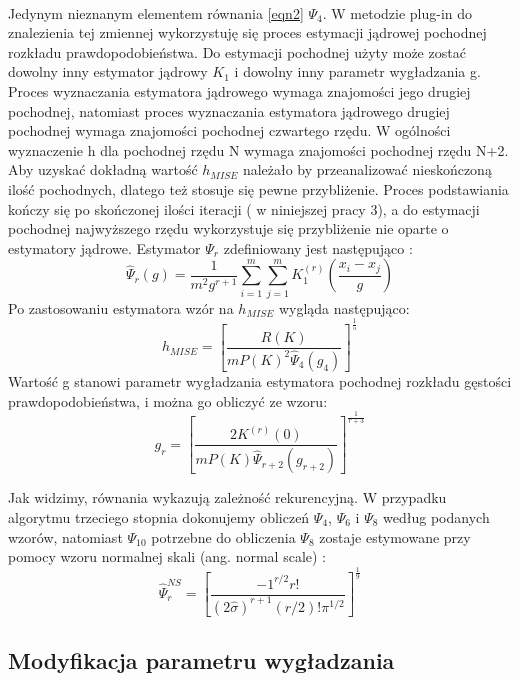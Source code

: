 \documentclass[a4paper,12pt,twoside]{article}
\begin{document}
\paragraph{}
Jedynym nieznanym elementem równania \ref{eqn2}  $\Psi_{4}$. W metodzie plug-in do znalezienia tej zmiennej wykorzystuję się proces estymacji jądrowej pochodnej rozkładu prawdopodobieństwa. Do estymacji pochodnej użyty może zostać dowolny inny estymator jądrowy $K_{1}$ i dowolny inny parametr wygładzania g. Proces wyznaczania estymatora jądrowego wymaga znajomości jego drugiej pochodnej, natomiast proces wyznaczania estymatora jądrowego drugiej pochodnej wymaga znajomości pochodnej czwartego rzędu. W ogólności wyznaczenie h dla pochodnej rzędu N wymaga znajomości pochodnej rzędu N+2. Aby uzyskać dokładną wartość $h_{MISE}$ należało by przeanalizować nieskończoną ilość pochodnych, dlatego też stosuje się pewne przybliżenie. Proces podstawiania kończy się po skończonej ilości iteracji ( w niniejszej pracy 3), a do estymacji pochodnej najwyższego rzędu wykorzystuje się przybliżenie nie oparte o estymatory jądrowe. 
Estymator $\Psi_{r}$ zdefiniowany jest następująco \cite{kde}:
\begin{equation} \hat{\Psi}_{r}(g)=\frac{1}{m^2g^{r+1}}\sum^m_{i=1}\sum^m_{j=1}K_{1}^{(r)}(\frac{x_{i}-x_{j}}{g})
\end{equation}
Po zastosowaniu estymatora wzór na $h_{MISE}$  wygląda następująco:
\begin{equation}  h_{MISE}=\left[ \frac{R(K)}{mP(K)^2 \hat{\Psi}_{4}(g_{4})}\right]^\frac{1}{5} 
\end{equation}
Wartość g stanowi parametr wygładzania estymatora pochodnej rozkładu gęstości prawdopodobieństwa, i można go obliczyć ze wzoru: 
\begin{equation}  g_{r}=\left[ \frac{2K^{(r)}(0)}{mP(K)\hat{\Psi}_{r+2}(g_{r+2})}\right]^\frac{1}{r+3} 
\end{equation}

Jak widzimy, równania wykazują zależność rekurencyjną. W przypadku algorytmu trzeciego stopnia dokonujemy obliczeń $\Psi_{4}$, $\Psi_{6}$ i $\Psi_{8}$ według podanych wzorów, natomiast $\Psi_{10}$ potrzebne do obliczenia $\Psi_{8}$ zostaje estymowane przy pomocy wzoru normalnej skali (ang. normal scale) \cite{kde2}:
\begin{equation} \hat{\Psi}^{NS}_{r}=\left[\frac{-1^{r/2}r!}{(2\hat{\sigma})^{r+1}(r/2)!\pi^{1/2}}\right]^\frac{1}{9} 
\end{equation}
\subsection{Modyfikacja parametru wygładzania}
\end{document}
